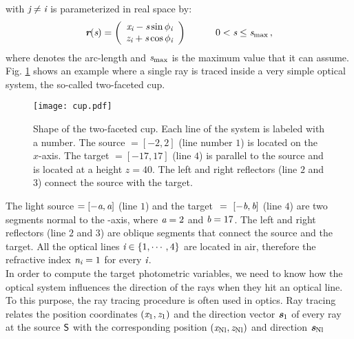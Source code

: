 with $\textit{j}\neq\textit{i}$ is parameterized in real space by:
\begin{equation}
\label{parametrization}
\textit{\textbf{r}}(\textit{s})=
\left( \begin{array}{cc}
\textit{x}_{\textit{i}}-\textit{s}\sin\phi_{\textit{i}} \\
\textit{z}_{\textit{i}}+\textit{s}\cos\phi_{\textit{i}}\end{array} \right) \qquad \quad 0< \textit{s}\leq \textit{s}_{\textrm{max}}\,,
\end{equation}
where  denotes the arc-length and $\textit{s}_{\textrm{max}}$ is the maximum value that it can assume. 
Fig. \ref{fig:cup} shows an example where a single ray is traced inside a very simple optical system, the so-called two-faceted cup. 
\begin{figure}[h]
\label{fig:cup}
  \begin{center}
\vspace{-1.5cm}
  \texttt{[image: cup.pdf]}
  \end{center}
\vspace{-2cm}
  \caption{\footnotesize{Shape of the two-faceted cup.  Each line of the system is labeled with a number.
   The source $= [-2,2]$ (line number $1$) is located on the $x$-axis.
   The target $= [-17, 17]$ (line $4$) is parallel to the source and is located at a height $z= 40$.
   The left and right reflectors (line $2$ and $3$) connect the source with the target.}}
  \label{fig:cup}
\end{figure}
The light source $= [-\textit{a}, \textit{a}]$ (line $1$) and the target $~=~ [-\textit{b}, \textit{b}]$ (line $4$) are two segments normal to the -axis, where $\textit{a}=2$ and $\textit{b}=17$.
The left and right reflectors (line $2$ and $3$) are oblique segments that connect the source and the target.
All the optical lines $\textit{i} \in \{1, \cdots, 4\}$  are located in air, therefore the refractive index $\textit{n}_{\textit{i}}=1$ for every $\textit{i}$. \\ \indent
In order to compute the target photometric variables, we need to know how the optical system influences the direction of the rays when they hit an optical line.
 To this purpose, the ray tracing procedure is often used in optics.
Ray tracing relates the position coordinates
 $ (\textit{x}_1, \textit{z}_1)$ and the direction vector $\textit{\textbf{s}}_1$ of every ray at the source $\textsf{S}$ with the corresponding position $(\textit{x}_{\textrm{Nl}}, \textit{z}_{\textrm{Nl}})$ and direction $\textit{\textbf{s}}_{\textrm{Nl}}$
